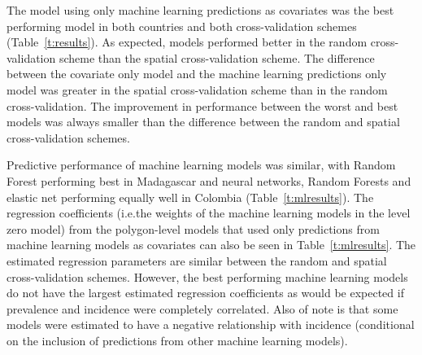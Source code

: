 \documentclass[11pt]{article}
\begin{document}

The model using only machine learning predictions as covariates was the best performing model in both countries and both cross-validation schemes (Table~\ref{t:results}).
As expected, models performed better in the random cross-validation scheme than the spatial cross-validation scheme.
The difference between the covariate only model and the machine learning predictions only model was greater in the spatial cross-validation scheme than in the random cross-validation.
The improvement in performance between the worst and best models was always smaller than the difference between the random and spatial cross-validation schemes.


Predictive performance of machine learning models was similar, with Random Forest performing best in Madagascar and neural networks, Random Forests and elastic net performing equally well in Colombia (Table~\ref{t:mlresults}).
The regression coefficients (i.e.\thinspace the weights of the machine learning models in the level zero model) from the polygon-level models that used only predictions from machine learning models as covariates can also be seen in Table~\ref{t:mlresults}.
The estimated regression parameters are similar between the random and spatial cross-validation schemes.
However, the best performing machine learning models do not have the largest estimated regression coefficients as would be expected if prevalence and incidence were completely correlated.
Also of note is that some models were estimated to have a negative relationship with incidence (conditional on the inclusion of predictions from other machine learning models).


%
\end{document}

